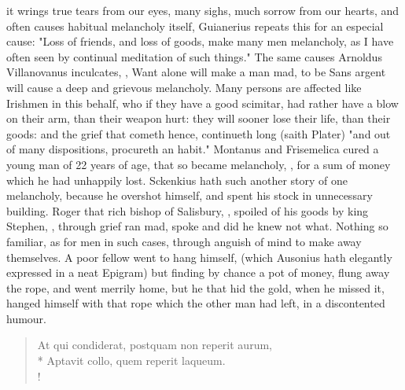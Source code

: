 it wrings true tears from our eyes, many sighs, much sorrow from our hearts,
and often causes habitual melancholy itself, Guianerius
 repeats this for an especial cause:
"Loss of friends, and loss of goods, make many men
melancholy, as I have often seen by continual meditation of such things." The
same causes Arnoldus Villanovanus inculcates,  , \etc{} Want alone
will make a man mad, to be Sans argent will cause a deep and grievous
melancholy. Many persons are affected like Irishmen in
this behalf, who if they have a good scimitar, had rather have a blow on their
arm, than their weapon hurt: they will sooner lose their life, than their
goods: and the grief that cometh hence, continueth long (saith
Plater) "and out of many dispositions, procureth an
habit." Montanus and Frisemelica cured a young man of 22
years of age, that so became melancholy, , for a sum of
money which he had unhappily lost. Sckenkius hath such another story of one
melancholy, because he overshot himself, and spent his stock in unnecessary
building. Roger that rich bishop of Salisbury, , spoiled of his goods by king Stephen,
, through
grief ran mad, spoke and did he knew not what. Nothing so familiar, as for men
in such cases, through anguish of mind to make away themselves. A poor fellow
went to hang himself, (which Ausonius hath elegantly expressed in a neat
Epigram) but finding by chance a pot of money, flung away
the rope, and went merrily home, but he that hid the gold, when he missed it,
hanged himself with that rope which the other man had left, in a discontented
humour.

\begin{latin}
\begin{verse}%
At qui condiderat, postquam non reperit aurum,\\*
Aptavit collo, quem reperit laqueum.\\!
\end{verse}%
\end{latin}


